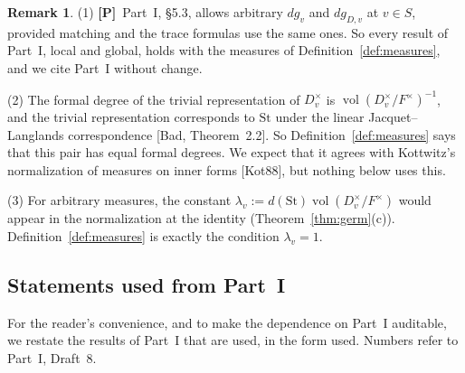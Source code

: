 \documentclass[12pt]{article}
\newcommand{\vol}{\operatorname{vol}}
\newcommand{\St}{\mathrm{St}}
\newcommand{\Pv}{\textbf{[P]}}
\theoremstyle{plain}
\theoremstyle{definition}
\newtheorem{remark}[theorem]{Remark}
\begin{document}
\begin{remark}\label{rem:measures}
(1) \Pv\ Part~I, \S5.3, allows arbitrary $dg_v$ and $dg_{D,v}$ at $v\in S$, provided matching and the trace formulas use the same ones. So every result of Part~I, local and global, holds with the measures of Definition~\ref{def:measures}, and we cite Part~I without change.

(2) The formal degree of the trivial representation of $D_v^\times$ is $\vol(D_v^\times/F^\times)^{-1}$, and the trivial representation corresponds to $\St$ under the linear Jacquet--Langlands correspondence [Bad, Theorem~2.2]. So Definition~\ref{def:measures} says that this pair has equal formal degrees. We expect that it agrees with Kottwitz's normalization of measures on inner forms [Kot88], but nothing below uses this.

(3) For arbitrary measures, the constant $\lambda_v:=d(\St)\vol(D_v^\times/F^\times)$ would appear in the normalization at the identity (Theorem~\ref{thm:germ}(c)). Definition~\ref{def:measures} is exactly the condition $\lambda_v=1$.
\end{remark}

\subsection{Statements used from Part~I}\label{subsec:fromPartI}
For the reader's convenience, and to make the dependence on Part~I auditable, we restate the results of Part~I that are used, in the form used. Numbers refer to Part~I, Draft~8.
\end{document}
